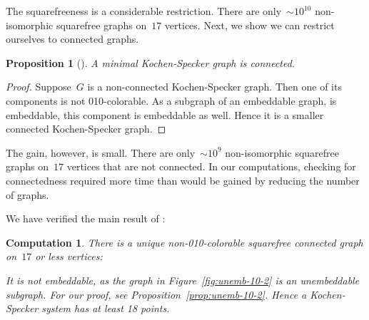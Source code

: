 \documentclass[adraft,copyright,creativecommons]{eptcs}
\newcounter{main}
\newtheorem{prop}[main]{Proposition}
\newtheorem{comp}[main]{Computation}
\theoremstyle{definition}
\theoremstyle{remark}
\begin{document}
The squarefreeness is a considerable restriction.  There are
only~${\sim}10^{10}$ non-isomorphic squarefree graphs on~$17$
vertices.\cite{sf-sloane}
Next, we show we can restrict ourselves to connected graphs.
\begin{prop}[\cite{aow11}]\label{prop:ks-conn}
    A minimal Kochen-Specker graph is connected.
\end{prop}
\begin{proof}
    Suppose~$G$ is a non-connected Kochen-Specker graph.
    Then one of its components is not 010-colorable.
    As a subgraph of an embeddable graph, is embeddable,
    this component is embeddable as well.
    Hence it is a smaller connected Kochen-Specker graph.
\end{proof}
The gain, however, is small.
There are only~${\sim}10^9$ non-isomorphic squarefree graphs on~$17$
vertices that are not connected.
In our computations, checking for connectedness
required more time than would be gained by reducing the number of graphs.

We have verified the main result of \cite{aow11}:
\begin{comp}
There is a unique non-010-colorable squarefree connected graph on~$17$ or less
vertices:
\begin{center}
\end{center}
It is not embeddable, as the graph in Figure~\ref{fig:unemb-10-2}
is an unembeddable subgraph.  For our proof,
see Proposition~\ref{prop:unemb-10-2}.
Hence a Kochen-Specker
system has at least 18 points.
\end{comp}
\end{document}
